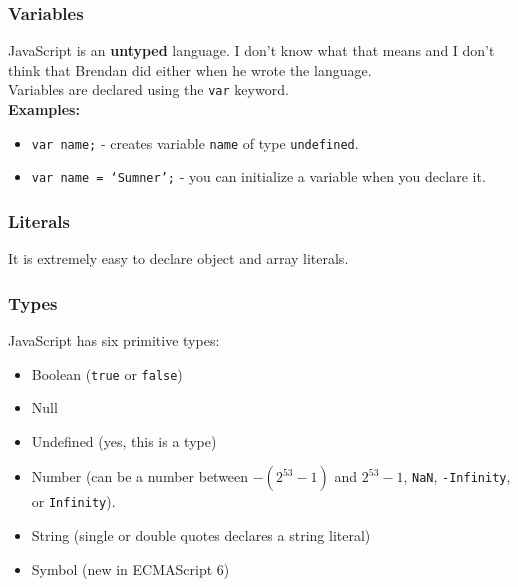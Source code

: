\documentclass{lug}
\begin{document}
\begin{frame}
    \frametitle{Variables}

    JavaScript is an \textbf{untyped} language. I don't know what that means and I don't
    think that Brendan did either when he wrote the language.\\

    Variables are declared using the \texttt{var} keyword\footnotemark[1]. \\

    \textbf{Examples:}

    \begin{itemize}
        \item \texttt{var name;} - creates variable \texttt{name} of type \texttt{undefined}.
        \item \texttt{var name = `Sumner';} - you can initialize a variable when you declare it.
    \end{itemize}

\end{frame}

\begin{frame}
    \frametitle{Literals}

    It is extremely easy to declare object and array literals.


\end{frame}

\begin{frame}
    \frametitle{Types\footnotemark[1]}

    JavaScript has six primitive types:

    \begin{itemize}
        \item Boolean (\texttt{true} or \texttt{false})
        \item Null
        \item Undefined (yes, this is a type)
        \item Number (can be a number between $-(2^{53} - 1)$ and $2^{53} - 1$, \texttt{NaN},
            \texttt{-Infinity}, or \texttt{Infinity}).
        \item String (single or double quotes declares a string literal\footnotemark[2])
        \item Symbol (new in ECMAScript 6)
    \end{itemize}

\end{frame}
\end{document}
